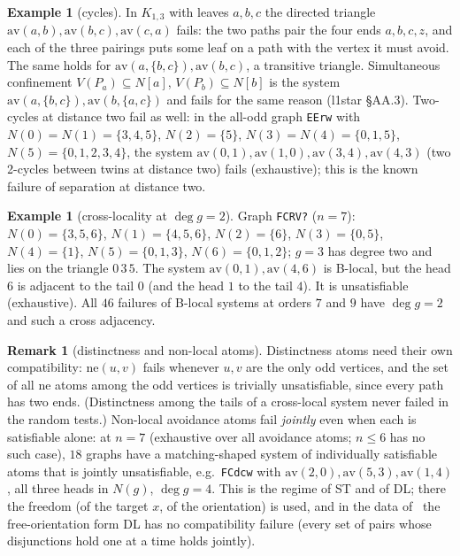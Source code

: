 \documentclass[11pt]{amsart}
\theoremstyle{definition}
\newtheorem{remark}[theorem]{Remark}
\newtheorem{example}[theorem]{Example}
\newcommand{\av}{\mathrm{av}}
\newcommand{\nev}{\mathrm{ne}}
\begin{document}
\begin{example}[cycles]\label{ex:cyc}
In $K_{1,3}$ with leaves $a,b,c$ the directed triangle $\av(a,b),\av(b,c),\av(c,a)$ fails: the
two paths pair the four ends $a,b,c,z$, and each of the three pairings puts some leaf on a path with
the vertex it must avoid. The same holds for $\av(a,\{b,c\}),\av(b,c)$, a transitive triangle.
Simultaneous confinement $V(P_a)\subseteq N[a]$, $V(P_b)\subseteq N[b]$ is the system
$\av(a,\{b,c\}),\av(b,\{a,c\})$ and fails for the same reason (l1star \S AA.3). Two-cycles at
distance two fail as well: in the all-odd graph \texttt{EErw} with $N(0)=N(1)=\{3,4,5\}$,
$N(2)=\{5\}$, $N(3)=N(4)=\{0,1,5\}$, $N(5)=\{0,1,2,3,4\}$, the system
$\av(0,1),\av(1,0),\av(3,4),\av(4,3)$ (two 2-cycles between twins at distance two) fails
(exhaustive); this is the known failure of separation at distance two.
\end{example}

\begin{example}[cross-locality at $\deg g=2$]\label{ex:deg2}
Graph \texttt{FCRV?} ($n=7$): $N(0)=\{3,5,6\}$, $N(1)=\{4,5,6\}$, $N(2)=\{6\}$, $N(3)=\{0,5\}$,
$N(4)=\{1\}$, $N(5)=\{0,1,3\}$, $N(6)=\{0,1,2\}$; $g=3$ has degree two and lies on the triangle
$0\,3\,5$. The system $\av(0,1),\av(4,6)$ is B-local, but the head $6$ is adjacent to the tail $0$
(and the head $1$ to the tail $4$).
It is unsatisfiable (exhaustive). All $46$ failures of B-local systems at orders $7$ and $9$ have
$\deg g=2$ and such a cross adjacency.
\end{example}

\begin{remark}[distinctness and non-local atoms]
Distinctness atoms need their own compatibility: $\nev(u,v)$ fails whenever $u,v$ are the only odd
vertices, and the set of all $\nev$ atoms among the odd vertices is trivially unsatisfiable, since
every path has two ends. (Distinctness among the tails of a cross-local system never failed in the
random tests.) Non-local avoidance atoms fail \emph{jointly} even when each is satisfiable alone: at
$n=7$ (exhaustive over all avoidance atoms; $n\le6$ has no such case), $18$ graphs have a matching-shaped system of individually satisfiable atoms that is
jointly unsatisfiable, e.g.\ \texttt{FCdcw} with $\av(2,0),\av(5,3),\av(1,4)$, all three heads in
$N(g)$, $\deg g=4$. This is the regime of ST and of DL; there the freedom (of the target $x$, of
the orientation) is used, and in the data of~\cite{DT} the free-orientation form DL has no
compatibility failure (every set of pairs whose disjunctions hold one at a time holds jointly).
\end{remark}
\end{document}
